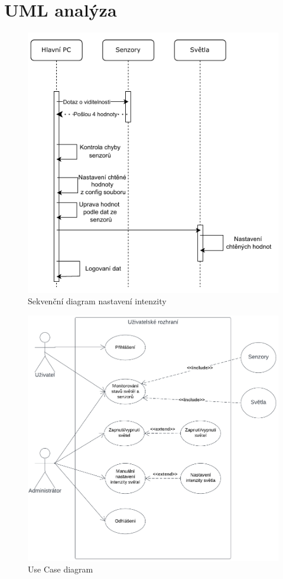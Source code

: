 \chapter{UML analýza}



\begin{figure}[H]
    \centering\includegraphics[width=.7\textwidth]{Figures/Sekvencni_diagram.pdf}   
    \caption{Sekvenční diagram nastavení intenzity}
    \label{Obr-Sekvencni_Diagram}
\end{figure}

\begin{figure}[H]
    \centering\includegraphics[width=.8\textwidth]{Figures/use_case_diagram_enviro.pdf}   
    \caption{Use Case diagram}
    \label{Obr-Use_Case_Diagram}
\end{figure}

\endinput
